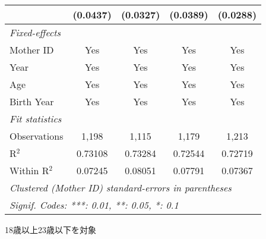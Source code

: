 \documentclass{article}
\begin{document}
\begin{threeparttable}[b]
\begin{tabular}{lcccc}
                                                    & (0.0437) & (0.0327)      & (0.0389)      & (0.0288)\\   
      \midrule
      \emph{Fixed-effects}\\
      Mother ID                                     & Yes      & Yes           & Yes           & Yes\\  
      Year                                          & Yes      & Yes           & Yes           & Yes\\  
      Age                                           & Yes      & Yes           & Yes           & Yes\\  
      Birth Year                                    & Yes      & Yes           & Yes           & Yes\\  
      \midrule
      \emph{Fit statistics}\\
      Observations                                  & 1,198    & 1,115         & 1,179         & 1,213\\  
      R$^2$                                         & 0.73108  & 0.73284       & 0.72544       & 0.72719\\  
      Within R$^2$                                  & 0.07245  & 0.08051       & 0.07791       & 0.07367\\  
      \midrule \midrule
      \multicolumn{5}{l}{\emph{Clustered (Mother ID) standard-errors in parentheses}}\\
      \multicolumn{5}{l}{\emph{Signif. Codes: ***: 0.01, **: 0.05, *: 0.1}}\\
   \end{tabular}
   
   \begin{tablenotes}\item 18歳以上23歳以下を対象
   \end{tablenotes}
\end{threeparttable}
\par\endgroup
\end{document}
